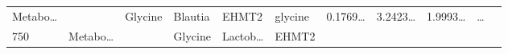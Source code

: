 \documentclass[
]{article}
\begin{document}
\begin{longtable}[]{@{}lllllllllll@{}}
\begin{minipage}[t]{0.07\columnwidth}
Metabo\ldots{}\strut
\end{minipage} & \begin{minipage}[t]{0.07\columnwidth}\raggedright
\strut
\end{minipage} & \begin{minipage}[t]{0.09\columnwidth}\raggedright
Glycine\strut
\end{minipage} & \begin{minipage}[t]{0.07\columnwidth}\raggedright
Blautia\strut
\end{minipage} & \begin{minipage}[t]{0.07\columnwidth}\raggedright
EHMT2\strut
\end{minipage} & \begin{minipage}[t]{0.09\columnwidth}\raggedright
glycine\strut
\end{minipage} & \begin{minipage}[t]{0.07\columnwidth}\raggedright
0.1769\ldots{}\strut
\end{minipage} & \begin{minipage}[t]{0.07\columnwidth}\raggedright
3.2423\ldots{}\strut
\end{minipage} & \begin{minipage}[t]{0.07\columnwidth}\raggedright
1.9993\ldots{}\strut
\end{minipage} & \begin{minipage}[t]{0.03\columnwidth}\raggedright
\ldots{}\strut
\end{minipage}\tabularnewline
\begin{minipage}[t]{0.05\columnwidth}\raggedright
750\strut
\end{minipage} & \begin{minipage}[t]{0.07\columnwidth}\raggedright
Metabo\ldots{}\strut
\end{minipage} & \begin{minipage}[t]{0.07\columnwidth}\raggedright
\strut
\end{minipage} & \begin{minipage}[t]{0.09\columnwidth}\raggedright
Glycine\strut
\end{minipage} & \begin{minipage}[t]{0.07\columnwidth}\raggedright
Lactob\ldots{}\strut
\end{minipage} & \begin{minipage}[t]{0.07\columnwidth}\raggedright
EHMT2\strut
\end{minipage} & \begin{minipage}[t]{0.09\columnwidth}\raggedright

\end{minipage}
\end{longtable}
\end{document}
